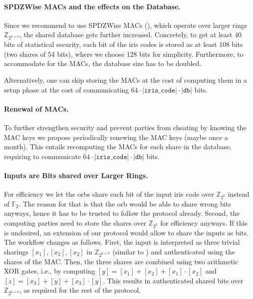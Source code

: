 \documentclass[a4paper,11pt,
]{article}
\newcommand{\F}{\ensuremath{\mathbb{F}}\xspace}
\newcommand{\Z}{\ensuremath{\mathbb{Z}}\xspace}
\newcommand{\shared}[1]{\ensuremath{[{#1}]}}
\begin{document}
\paragraph{SPDZWise MACs and the effects on the Database.}
Since we recommend to use SPDZWise MACs (), which operate over larger rings $\Z_{2^{k + \sigma}}$, the shared database gets further increased. Concretely, to get at least $40$ bits of statistical security, each bit of the iris codes is stored as at least 108 bits (two shares of 54 bits), where we choose 128 bits for simplicity. Furthermore, to accommodate for the MACs, the database size has to be doubled.

Alternatively, one can skip storing the MACs at the cost of computing them in a setup phase at the cost of communicating $64 \cdot |\texttt{iris\_code}| \cdot |\texttt{db}|$ bits.

\paragraph{Renewal of MACs.}
To further strengthen security and prevent parties from cheating by knowing the MAC keys we propose periodically renewing the MAC keys (maybe once a month). This entails recomputing the MACs for each share in the database, requiring to communicate $64 \cdot |\texttt{iris\_code}| \cdot |\texttt{db}|$ bits.

\paragraph{Inputs are Bits shared over Larger Rings.}
For efficiency we let the orbs share each bit of the input iris code over $\Z_{2^k}$ instead of $\F_2$. The reason for that is that the orb would be able to share wrong bits anyways, hence it has to be trusted to follow the protocol already. Second, the computing parties need to store the shares over $\Z_{2^k}$ for efficiency anyways.
If this is undesired, an extension of our protocol would allow to share the inputs as bits. The workflow changes as follows. First, the input is interpreted as three trivial sharings $\shared{x_1}, \shared{x_2}, \shared{x_2}$ in $\Z_{2^{k + \sigma}}$ (similar to ) and authenticated using the shares of the MAC. Then, the three shares are combined using two arithmetic XOR gates, i.e., by computing $\shared{y} = \shared{x_1}+ \shared{x_2} + \shared{x_1} \cdot \shared{x_2}$ and $\shared{z} = \shared{x_3} + \shared{y} + \shared{x_3} \cdot \shared{y}$. This results in authenticated shared bits over $\Z_{2^{k + \sigma}}$, as required for the rest of the protocol.

\printbibliography
\end{document}
